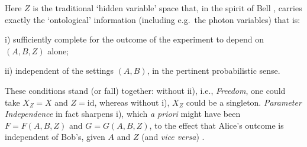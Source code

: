 \documentclass[12pt]{article}
\begin{document}
\noindent Here $Z$ is the traditional `hidden variable' space that, in the spirit of Bell \cite{Bell4,Norsen1,SU},
carries exactly the  `ontological' information (including e.g.\ the photon variables) that is:
\begin{description}
\item i)  sufficiently complete for the outcome of the experiment to depend on $(A,B,Z)$ alone; 
\item  ii) independent of the settings $(A,B)$, in the pertinent probabilistic sense.
\end{description}
These conditions stand (or fall) together: without ii), i.e., \emph{Freedom}, one could  take $X_Z=X$ and $Z=\mathrm{id}$, whereas without i), $X_Z$ could be a singleton. 
\emph{Parameter Independence} in fact  sharpens i), which \emph{a priori} might have been $F=F(A,B,Z)$ and $G=G(A,B,Z)$,  to the effect that Alice's outcome is independent of Bob's, given $A$ and $Z$ (and \emph{vice versa}) \cite{Bell1}.
\smallskip
\end{document}

